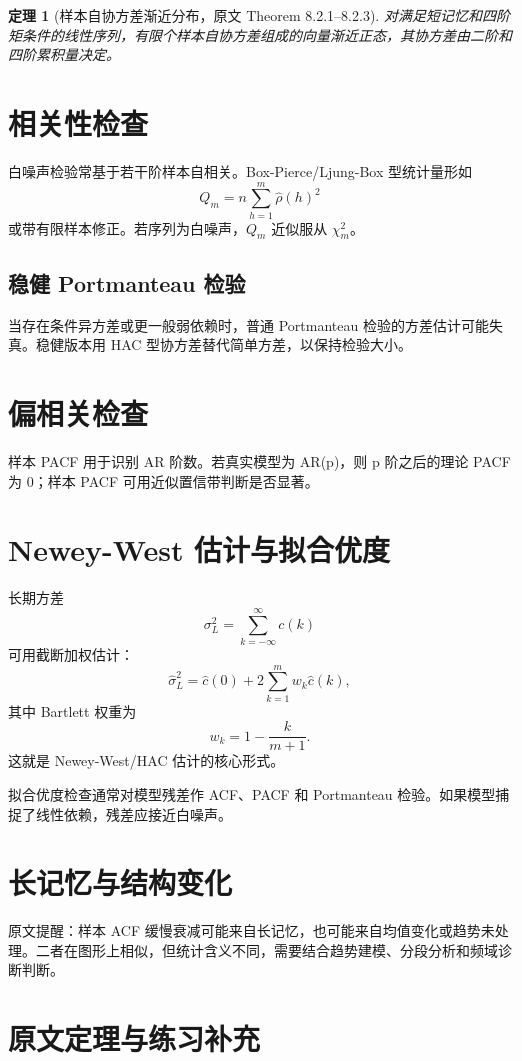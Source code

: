\documentclass[11pt,a4paper]{ctexart}
\newtheorem{theorem}{定理}[section]
\begin{document}
\begin{theorem}[样本自协方差渐近分布，原文 Theorem 8.2.1--8.2.3]
对满足短记忆和四阶矩条件的线性序列，有限个样本自协方差组成的向量渐近正态，其协方差由二阶和四阶累积量决定。
\end{theorem}

\section{相关性检查}

白噪声检验常基于若干阶样本自相关。Box-Pierce/Ljung-Box 型统计量形如
\[
  Q_m=n\sum_{h=1}^m\hat\rho(h)^2
\]
或带有限样本修正。若序列为白噪声，\(Q_m\) 近似服从 \(\chi_m^2\)。

\subsection{稳健 Portmanteau 检验}

当存在条件异方差或更一般弱依赖时，普通 Portmanteau 检验的方差估计可能失真。稳健版本用 HAC 型协方差替代简单方差，以保持检验大小。

\section{偏相关检查}

样本 PACF 用于识别 AR 阶数。若真实模型为 AR(p)，则 p 阶之后的理论 PACF 为 0；样本 PACF 可用近似置信带判断是否显著。

\section{Newey-West 估计与拟合优度}

长期方差
\[
  \sigma_L^2=\sum_{k=-\infty}^{\infty}c(k)
\]
可用截断加权估计：
\[
  \hat\sigma_L^2=\hat c(0)+2\sum_{k=1}^{m}w_k\hat c(k),
\]
其中 Bartlett 权重为
\[
  w_k=1-\frac{k}{m+1}.
\]
这就是 Newey-West/HAC 估计的核心形式。

拟合优度检查通常对模型残差作 ACF、PACF 和 Portmanteau 检验。如果模型捕捉了线性依赖，残差应接近白噪声。

\section{长记忆与结构变化}

原文提醒：样本 ACF 缓慢衰减可能来自长记忆，也可能来自均值变化或趋势未处理。二者在图形上相似，但统计含义不同，需要结合趋势建模、分段分析和频域诊断判断。

\section{原文定理与练习补充}
\end{document}
